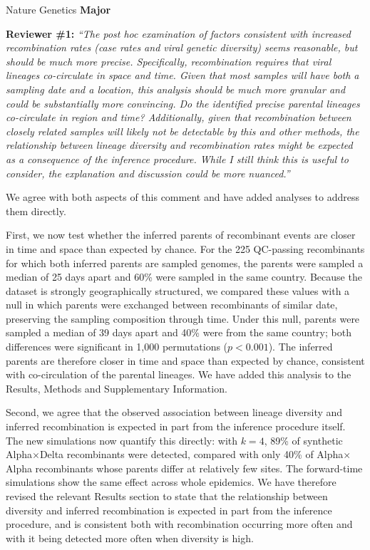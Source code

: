 \documentclass{letter}
\begin{document}
\begin{letter}{Nature Genetics}
\medskip
\noindent \textbf{Major}

\noindent \textbf{Reviewer \#1:} \textit{``The post hoc examination of factors
consistent with increased recombination rates (case rates and viral genetic
diversity) seems reasonable, but should be much more precise. Specifically,
recombination requires that viral lineages co-circulate in space and time.
Given that most samples will have both a sampling date and a location, this
analysis should be much more granular and could be substantially more
convincing. Do the identified precise parental lineages co-circulate in region
and time? Additionally, given that recombination between closely related
samples will likely not be detectable by this and other methods, the
relationship between lineage diversity and recombination rates might be
expected as a consequence of the inference procedure. While I still think this
is useful to consider, the explanation and discussion could be more
nuanced.''}

We agree with both aspects of this comment and have added analyses to address
them directly.

First, we now test whether the inferred parents of recombinant events are
closer in time and space than expected by chance. For the 225 QC-passing
recombinants for which both inferred parents are sampled genomes, the parents
were sampled a median of 25 days apart and 60\% were sampled in the same
country. Because the dataset is strongly geographically structured, we compared
these values with a null in which parents were exchanged between recombinants
of similar date, preserving the sampling composition through time. Under this
null, parents were sampled a median of 39 days apart and 40\% were from the same
country; both differences were significant in 1,000 permutations ($p < 0.001$).
The inferred parents are therefore closer in time and space than expected by
chance, consistent with co-circulation of the parental lineages. We have added
this analysis to the Results, Methods and Supplementary Information.

Second, we agree that the observed association between lineage diversity and
inferred recombination is expected in part from the inference procedure itself.
The new simulations now quantify this directly: with $k = 4$, 89\% of synthetic
Alpha$\times$Delta recombinants were detected, compared with only 40\% of
Alpha$\times$Alpha recombinants whose parents differ at relatively few sites.
The forward-time simulations show the same effect across whole epidemics. We
have therefore revised the relevant Results section to state that the
relationship between diversity and inferred recombination is expected in part
from the inference procedure, and is consistent both with recombination
occurring more often and with it being detected more often when diversity is
high.


\end{letter}
\end{document}
